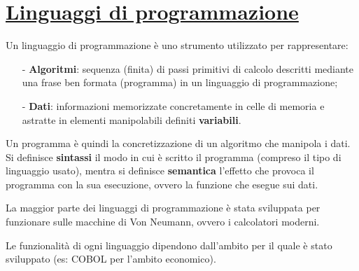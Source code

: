 \documentclass[a4paper, 10pt]{report}
\begin{document}
\section*{\underline{Linguaggi di programmazione}}
Un linguaggio di programmazione è uno strumento utilizzato per rappresentare:

\begin{itemize}
\item[-] \textbf{Algoritmi}: sequenza (finita) di passi primitivi di calcolo descritti mediante una frase ben formata (programma) in un linguaggio di programmazione; 
\item[-] \textbf{Dati}: informazioni   memorizzate concretamente   in   celle   di   memoria   e astratte  in  elementi  manipolabili definiti \textbf{variabili}.
\end{itemize}

\noindent Un programma è quindi la concretizzazione di un algoritmo che manipola i dati. Si definisce \textbf{sintassi} il modo in cui è scritto il programma (compreso il tipo di linguaggio usato), mentra si definisce \textbf{semantica} l'effetto che provoca il programma con la sua esecuzione, ovvero la funzione che esegue sui dati.

La maggior parte dei linguaggi di programmazione è stata sviluppata per funzionare sulle macchine di Von Neumann, ovvero i calcolatori moderni.

Le funzionalità di ogni linguaggio dipendono dall'ambito per il quale è stato sviluppato (es: COBOL per l'ambito economico).
\end{document}
